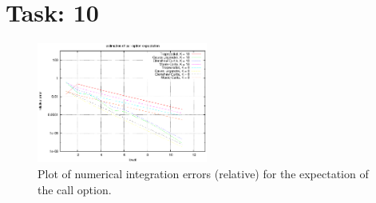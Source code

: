 \documentclass{article}
\begin{document}
\section*{Task: 10}

\begin{figure}[htbp]
  \centering
     \includegraphics[width=0.50\textwidth]{../Task10/task10_convergence_plot.eps}
   \caption{Plot of numerical integration errors (relative) for the expectation of the call option.}
\end{figure}
\end{document}

